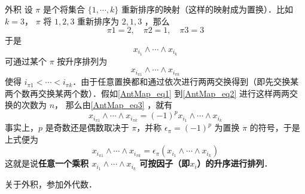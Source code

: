 \begin{example}{外积}
设 $\pi$ 是个将集合 $\{1,\cdots,k\}$ 重新排序的映射（这样的映射成为置换）．比如$k=3$， $\pi$ 将 $1,2,3$ 重新排序为 $2,1,3$ ，那么
\begin{equation}
\pi 1=2,\quad\pi2=1,\quad \pi3=3
\end{equation}
于是
\begin{equation}\label{AntMap_eq1}
x_{i_1}\wedge\cdots\wedge x_{i_k}
\end{equation}
可通过某个 $\pi$ 按升序排列为
\begin{equation}\label{AntMap_eq2}
x_{i_{\pi1}}\wedge\cdots\wedge x_{i_{\pi k}}
\end{equation}
使得 $i_{\pi1}<\cdots< i_{\pi k}$．由于任意置换都和通过依次进行两两交换得到（即先交换某两个数再交换某两个数）．假如\autoref{AntMap_eq1} 到\autoref{AntMap_eq2} 进行这样两两交换的次数为 $n$，
那么由\autoref{AntMap_eq3} ，就有
\begin{equation}
x_{i_{\pi1}}\wedge\cdots\wedge x_{i_{\pi k}}=(-1)^p x_{i_1}\wedge\cdots\wedge x_{i_k}
\end{equation}
事实上，$p$ 是奇数还是偶数取决于 $\pi$，并称 $\epsilon_\pi=(-1)^p$ 为置换 $\pi$ 的符号，于是上式便为
\begin{equation}
x_{i_{\pi1}}\wedge\cdots\wedge x_{i_{\pi k}}=\epsilon_\pi (x_{i_1}\wedge\cdots\wedge x_{i_k})
\end{equation}
这就是说\textbf{任意一个乘积 $x_{i_1}\wedge\cdots\wedge x_{i_k}$ 可按因子（即$x_i$）的升序进行排列}．

关于外积，参加外代数．
\end{example}

